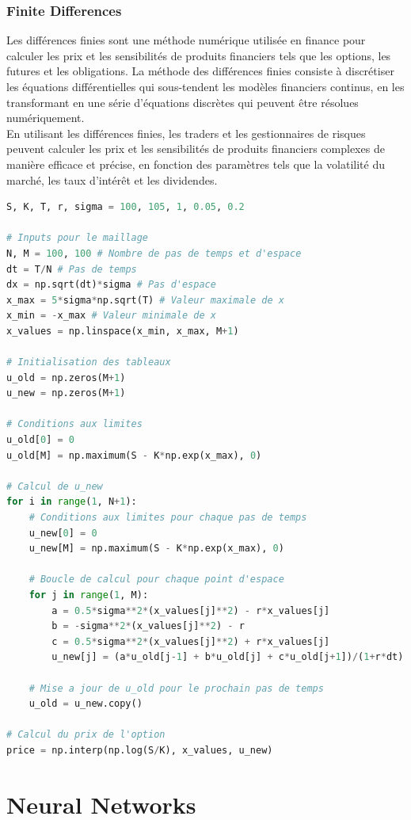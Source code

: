 \documentclass[a4paper]{article}
\begin{document}
\subsubsection{Finite Differences}
Les différences finies sont une méthode numérique utilisée en finance pour calculer les prix et les sensibilités de produits financiers tels que les options, les futures et les obligations. La méthode des différences finies consiste à discrétiser les équations différentielles qui sous-tendent les modèles financiers continus, en les transformant en une série d'équations discrètes qui peuvent être résolues numériquement.
\\
En utilisant les différences finies, les traders et les gestionnaires de risques peuvent calculer les prix et les sensibilités de produits financiers complexes de manière efficace et précise, en fonction des paramètres tels que la volatilité du marché, les taux d'intérêt et les dividendes. 
\begin{lstlisting}[language=Python]
S, K, T, r, sigma = 100, 105, 1, 0.05, 0.2 

# Inputs pour le maillage
N, M = 100, 100 # Nombre de pas de temps et d'espace
dt = T/N # Pas de temps
dx = np.sqrt(dt)*sigma # Pas d'espace
x_max = 5*sigma*np.sqrt(T) # Valeur maximale de x
x_min = -x_max # Valeur minimale de x
x_values = np.linspace(x_min, x_max, M+1)

# Initialisation des tableaux
u_old = np.zeros(M+1)
u_new = np.zeros(M+1)

# Conditions aux limites
u_old[0] = 0
u_old[M] = np.maximum(S - K*np.exp(x_max), 0)

# Calcul de u_new
for i in range(1, N+1):
    # Conditions aux limites pour chaque pas de temps
    u_new[0] = 0
    u_new[M] = np.maximum(S - K*np.exp(x_max), 0)
    
    # Boucle de calcul pour chaque point d'espace
    for j in range(1, M):
        a = 0.5*sigma**2*(x_values[j]**2) - r*x_values[j]
        b = -sigma**2*(x_values[j]**2) - r
        c = 0.5*sigma**2*(x_values[j]**2) + r*x_values[j]
        u_new[j] = (a*u_old[j-1] + b*u_old[j] + c*u_old[j+1])/(1+r*dt)
    
    # Mise a jour de u_old pour le prochain pas de temps
    u_old = u_new.copy()

# Calcul du prix de l'option
price = np.interp(np.log(S/K), x_values, u_new)
\end{lstlisting}

\section{Neural Networks}
\end{document}
